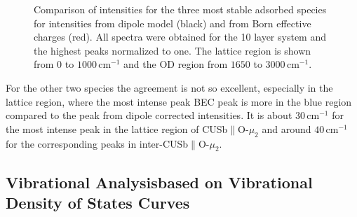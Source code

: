 \documentclass[11pt,DIV=13,BCOR=5mm,a4paper,headinclude]{scrbook}
\begin{document}
\begin{figure}[!h]
             \quad
             \caption{Comparison of intensities for the three most stable adsorbed species for intensities from dipole model (black) and from Born effective charges (red).
             All spectra were obtained for the 10 layer system and the highest peaks normalized to one.
             The lattice region is shown from $0$ to $1000\,$cm$^{-1}$ and the OD region from $1650$ to $3000\,$cm$^{-1}$.
             }
            \label{abb:bec-dip-comp}
\end{figure}
For the other two species the agreement is not so excellent, especially in the lattice region, where the most intense peak BEC peak is more in the blue region compared to the peak from dipole corrected intensities.
It is about $30\,$cm$^{-1}$ for the most intense peak in the lattice region of CUSb$\parallel$O-$\mu_2$ and around $40\,$cm$^{-1}$ for the corresponding peaks in inter-CUSb$\parallel$O-$\mu_2$.


\clearpage
\subsection{Vibrational Analysisbased on Vibrational Density of States Curves}\label{vvacf}
\end{document}
